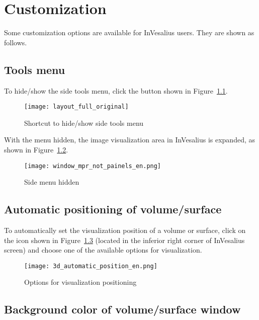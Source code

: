 \chapter{Customization}

Some customization options are available for InVesalius users. They are shown as follows.

\section{Tools menu}

To hide/show the side tools menu, click the button shown in Figure~\ref{fig:layout_full_original}.

\begin{figure}[!htb]
\centering
\texttt{[image: layout\_full\_original]}
\caption{Shortcut to hide/show side tools menu}
\label{fig:layout_full_original}
\end{figure}

With the menu hidden, the image visualization area in InVesalius is expanded, as shown in Figure~\ref{fig:closed_tool_menu}.

\begin{figure}[!htb]
\centering
\texttt{[image: window\_mpr\_not\_painels\_en.png]}
\caption{Side menu hidden}
\label{fig:closed_tool_menu}
\end{figure}

\newpage

\section{Automatic positioning of volume/surface}

To automatically set the visualization position of a volume or surface, click on the icon shown in Figure~\ref{fig:3d_automatic_position} (located in the inferior right corner of InVesalius screen) and choose one of the available options for visualization.

\begin{figure}[!htb]
\centering
\texttt{[image: 3d\_automatic\_position\_en.png]}
\caption{Options for visualization positioning}
\label{fig:3d_automatic_position}
\end{figure}

\section{Background color of volume/surface window}

